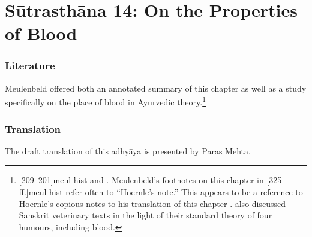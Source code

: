
\chapter{Sūtrasthāna 14:  On the Properties of Blood}


\subsection{Literature}

Meulenbeld offered both an annotated summary of this chapter as well as a
study specifically on the place of blood in Ayurvedic
theory.\footnote{[209--201]{meul-hist}  and \cite{meul-1991}.
    Meulenbeld's footnotes on this chapter in
    [325\,ff.]{meul-hist} refer often to ``Hoernle's note.'' 
    This appears to be a reference to Hoernle's copious notes to his
    translation of this chapter \citep[87--98]{hoer-1897}. \citet{meul-1990}
    also discussed Sanskrit veterinary texts in the light of their standard
    theory of four humours, including blood.}

\subsection{Translation}

The draft translation of this adhyāya is presented by Paras Mehta.

